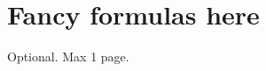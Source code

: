 \documentclass[12pt,a4paper,openright,twoside]{book}
\begin{document}
\section{Fancy formulas here}


\backmatter

\nocite{*} %




\begin{acknowledgements} %
Optional. Max 1 page.
\end{acknowledgements}
\end{document}
